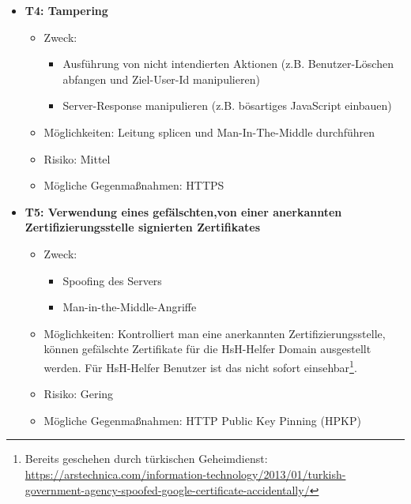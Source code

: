 \documentclass[12pt,DIV14,BCOR10mm,a4paper,parskip=half-,headsepline,headinclude,english,ngerman,bibliography=totocnumbered]{scrreprt}
\begin{document}
\begin{itemize}
  \hypertarget{threat4}{}
  \item \textbf{T4: Tampering}
  \begin{itemize}
  \item Zweck:
  	\begin{itemize}
  		\item Ausführung von nicht intendierten Aktionen (z.B. Benutzer-Löschen abfangen und Ziel-User-Id manipulieren)
  		\item Server-Response manipulieren (z.B. bösartiges JavaScript einbauen)
	\end{itemize}
  \item Möglichkeiten: Leitung splicen und Man-In-The-Middle durchführen
  \item Risiko: Mittel
  \item Mögliche Gegenmaßnahmen: HTTPS
  \end{itemize}

  \hypertarget{threat5}{}
  \item \textbf{T5: Verwendung eines gefälschten,von einer anerkannten Zertifizierungsstelle signierten Zertifikates}
  \begin{itemize}
  \item Zweck:
  	\begin{itemize}
  		\item Spoofing des Servers
  		\item Man-in-the-Middle-Angriffe
   \end{itemize}
  \item Möglichkeiten: Kontrolliert man eine anerkannten Zertifizierungsstelle, können gefälschte Zertifikate für die HsH-Helfer Domain ausgestellt werden. Für HsH-Helfer Benutzer ist das nicht sofort einsehbar\footnote{Bereits geschehen durch türkischen Geheimdienst: \url{https://arstechnica.com/information-technology/2013/01/turkish-government-agency-spoofed-google-certificate-accidentally/}}.
  \item Risiko: Gering
  \item Mögliche Gegenmaßnahmen: HTTP Public Key Pinning (HPKP)
  \end{itemize}


\end{itemize}
\end{document}
